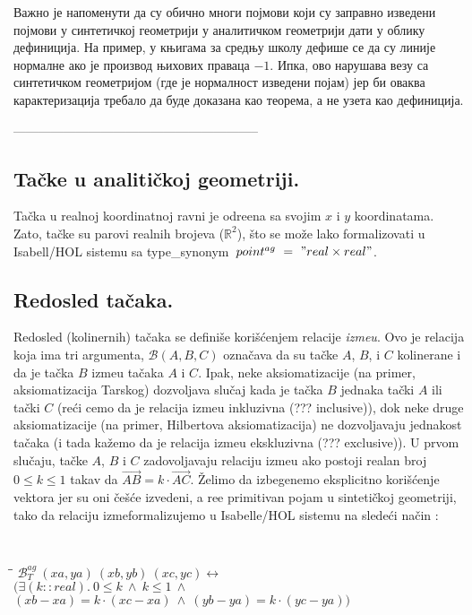 \documentclass[a4paper, 12pt]{article}
\newcommand{\agbett}[3]{\ensuremath{\mathcal{B}_T^{\mathit{ag}}\ #1\ #2\ #3}}
\newcommand{\vect}[1]{\vec{#1}}
\begin{document}
Важно је напоменути да су обично многи појмови који су заправно
изведени појмови у синтетичкој геометрији у аналитичком геометрији
дати у облику дефиниција. На пример, у књигама за средњу школу дефише
се да су линије нормалне ако је производ њихових праваца $-1$. Ипка,
ово нарушава везу са синтетичком геометријом (где је нормалност
изведени појам) јер би оваква карактеризација требало да буде доказана
као теорема, а не узета као дефиниција.

-----------------------------------------------------------

\subsection{Ta\v cke u analiti\v ckoj geometriji.}
Ta\v cka u realnoj koordinatnoj ravni je odre\dj ena sa svojim $x$ i
$y$ koordinatama. Zato, ta\v cke su parovi realnih brojeva
($\mathbb{R}^2$), \v sto se mo\v ze lako formalizovati u {\lat
  Isabell/HOL} sistemu sa {\lattt type\_synonym\ $point^{ag}\ =\ "real
  \times real"$}.


\subsection{Redosled ta\v caka.} Redosled (kolinernih) ta\v caka se
defini\v se kori\v s\'cenjem relacije \emph{izme\dj u}. Ovo je
relacija koja ima tri argumenta, $\mathcal{B}(A, B, C)$ ozna\v cava da
su ta\v cke $A$, $B$, i $C$ kolinerane i da je ta\v cka $B$ izme\dj u
ta\v caka $A$ i $C$. Ipak, neke aksiomatizacije (na primer,
aksiomatizacija Tarskog) dozvoljava slu\v caj kada je ta\v cka $B$
jednaka ta\v cki $A$ ili ta\v cki $C$ (re\'ci cemo da je relacija
izme\dj u inkluzivna (??? {\lat inclusive})), dok neke druge
aksiomatizacije (na primer, Hilbertova aksiomatizacija) ne
dozvoljavaju jednakost ta\v caka (i tada ka\v zemo da je relacija
izme\dj u ekskluzivna (??? {\lat exclusive})). U prvom slu\v caju,
ta\v cke $A$, $B$ i $C$ zadovoljavaju relaciju izme\dj u ako postoji
realan broj $0 \le k \le 1$ takav da $\vect{AB} = k \cdot
\vect{AC}$. \v Zelimo da izbegenemo eksplicitno kori\v s\'cenje
vektora jer su oni \v ce\v s\'ce izvedeni, a re\dj e primitivan pojam u
sinteti\v ckoj geometriji, tako da relaciju izme\dj formalizujemo u
{\lat Isabelle/HOL} sistemu na slede\'ci na\v cin :

{\tt
\begin{tabbing}
\hspace{5mm}\=\hspace{5mm}\=\kill
$\agbett{(xa, ya)}{(xb, yb)}{(xc, yc)} \longleftrightarrow$\\
\>$(\exists (k::real).\ 0 \le k \ \wedge\ k \le 1 \ \wedge$\\
\>\>$(xb - xa) = k \cdot (xc - xa) \ \wedge\ (yb - ya) = k \cdot (yc - ya))$
\end{tabbing}
}
\end{document}
